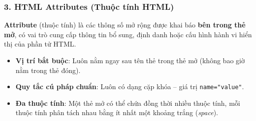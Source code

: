 \documentclass[11pt,oneside]{book}
\newcommand{\codeinline}[1]{\textcolor{accentOrange}{\texttt{#1}}}
\newcommand{\term}[1]{\textbf{\textcolor{primaryBlue}{#1}}}
\begin{document}
\subsubsection{3. HTML Attributes (Thuộc tính HTML)}

\begin{conceptBox}
\term{Attribute} (thuộc tính) là các thông số mở rộng được khai báo \textbf{bên trong thẻ mở}, có vai trò cung cấp thông tin bổ sung, định danh hoặc cấu hình hành vi hiển thị của phần tử HTML.
\begin{itemize}[leftmargin=1.5em, itemsep=2pt, parsep=0pt]
    \item \textbf{Vị trí bắt buộc}: Luôn nằm ngay sau tên thẻ trong thẻ mở (không bao giờ nằm trong thẻ đóng).
    \item \textbf{Quy tắc cú pháp chuẩn}: Luôn có dạng cặp khóa -- giá trị \codeinline{name="value"}.
    \item \textbf{Đa thuộc tính}: Một thẻ mở có thể chứa đồng thời nhiều thuộc tính, mỗi thuộc tính phân tách nhau bằng ít nhất một khoảng trắng (\textit{space}).
\end{itemize}
\end{conceptBox}
\end{document}
